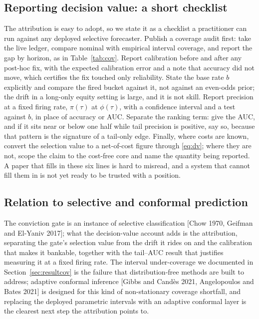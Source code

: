 \documentclass[10pt, a4paper, oneside]{article}
\theoremstyle{definition}
\theoremstyle{plain}
\begin{document}
\subsection{Reporting decision value: a short checklist}
\label{sec:checklist}
The attribution is easy to adopt, so we state it as a checklist a practitioner can run
against any deployed selective forecaster. Publish a coverage audit first: take the live
ledger, compare nominal with empirical interval coverage, and report the gap by horizon,
as in Table~\ref{tab:cov}. Report calibration before and after any post-hoc fix, with
the expected calibration error and a note that accuracy did not move, which certifies
the fix touched only reliability. State the base rate $b$ explicitly and compare the
fired bucket against it, not against an even-odds prior; the drift in a long-only equity
setting is large, and it is not skill. Report precision at a fixed firing rate,
$\pi(\tau)$ at $\phi(\tau)$, with a confidence interval and a test against $b$, in place
of accuracy or AUC. Separate the ranking term: give the AUC, and if it sits near or
below one half while tail precision is positive, say so, because that pattern is the
signature of a tail-only edge. Finally, where costs are known, convert the selection
value to a net-of-cost figure through \eqref{eq:dv}; where they are not, scope the claim
to the cost-free core and name the quantity being reported. A paper that fills in these
six lines is hard to misread, and a system that cannot fill them in is not yet ready to
be trusted with a position.

\subsection{Relation to selective and conformal prediction}
The conviction gate is an instance of selective classification [Chow 1970,
Geifman and El-Yaniv 2017]; what the decision-value account adds is the attribution,
separating the gate's selection value from the drift it rides on and the calibration
that makes it bankable, together with the tail--AUC result that justifies measuring it at a
fixed firing rate. The interval under-coverage we documented in
Section~\ref{sec:resultcov} is the failure that distribution-free methods are
built to address; adaptive conformal inference [Gibbs and Cand\`es 2021,
Angelopoulos and Bates 2021] is designed for this kind of non-stationary
coverage shortfall, and replacing the deployed parametric intervals with an adaptive
conformal layer is the clearest next step the attribution points to.
\end{document}
